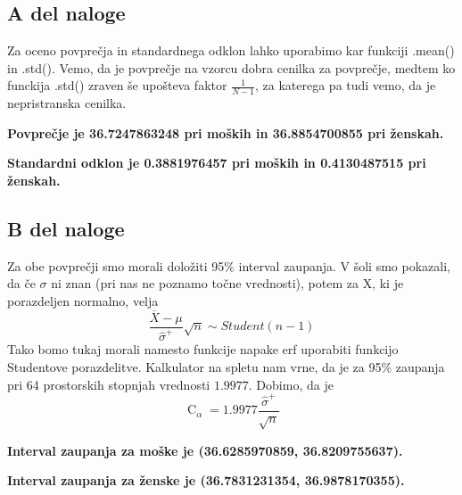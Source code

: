 \documentclass{article}
\DeclareMathOperator{\CM}{C}
\begin{document}
    \subsection{A del naloge}
    Za oceno povprečja in standardnega odklon lahko uporabimo kar funkciji .mean() in .std(). Vemo, da je povprečje na vzorcu dobra cenilka za povprečje, medtem ko funckija
    .std() zraven še upošteva faktor $\frac{1}{N - 1}$, za katerega pa tudi vemo, da je nepristranska cenilka.
    \par \textbf{Povprečje je 36.7247863248 pri moških in 36.8854700855 pri ženskah.}
    \par \textbf{Standardni odklon je 0.3881976457 pri moških in 0.4130487515 pri ženskah.}

    \subsection{B del naloge}
    Za obe povprečji smo morali doložiti 95\% interval zaupanja. V šoli smo pokazali, da če $\sigma$ ni znan (pri nas ne poznamo točne vrednosti), potem za X, ki je
    porazdeljen normalno, velja
    \[
        \frac{\overline{X} - \mu}{\widehat{\sigma}^{+}} \sqrt{n} \sim Student(n - 1)
    \]
    Tako bomo tukaj morali namesto funkcije napake erf uporabiti funkcijo Studentove porazdelitve. Kalkulator na spletu nam vrne, da je za 95\% zaupanja pri 64 prostorskih stopnjah
    vrednosti $1.9977$. Dobimo, da je 
    \[
        \CM_{\alpha} = 1.9977\frac{\widehat{\sigma}^{+}}{\sqrt{n}}
    \]
    \par \textbf{Interval zaupanja za moške je (36.6285970859, 36.8209755637).}
    \par \textbf{Interval zaupanja za ženske je (36.7831231354, 36.9878170355).}
\end{document}
